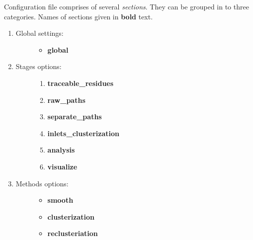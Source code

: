 \documentclass[a4paper,10pt,english]{sphinxmanual}
\begin{document}
Configuration file comprises of several \emph{sections}. They can be grouped in to three categories. Names of sections given in \textbf{bold} text.
\begin{enumerate}
\item {} \begin{description}
\item[{Global settings:}] \leavevmode\begin{itemize}
\item {} 
\textbf{global}

\end{itemize}

\end{description}

\item {} \begin{description}
\item[{Stages options:}] \leavevmode\begin{enumerate}
\item {} 
\textbf{traceable\_residues}

\item {} 
\textbf{raw\_paths}

\item {} 
\textbf{separate\_paths}

\item {} 
\textbf{inlets\_clusterization}

\item {} 
\textbf{analysis}

\item {} 
\textbf{visualize}

\end{enumerate}

\end{description}

\item {} \begin{description}
\item[{Methods options:}] \leavevmode\begin{itemize}
\item {} 
\textbf{smooth}

\item {} 
\textbf{clusterization}

\item {} 
\textbf{reclusteriation}

\end{itemize}

\end{description}

\end{enumerate}
\end{document}
